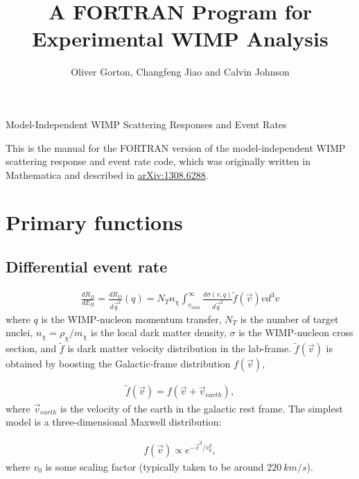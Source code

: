 \documentclass[11pt]{amsart}
\title{A FORTRAN Program for Experimental WIMP Analysis}
\author{Oliver Gorton, Changfeng Jiao and Calvin Johnson}
\begin{document}
\maketitle

{
\centering

Model-Independent WIMP Scattering Responses and Event Rates

}

\tableofcontents

This is the manual for the FORTRAN version of the model-independent WIMP scattering response and event rate code, which was originally written in Mathematica and described in \href{http://arxiv.org/abs/1308.6288v1}{arXiv:1308.6288}.

\section{Primary functions}

\subsection{Differential event rate}
\begin{equation}\label{ER}
\begin{split}
	\frac{dR_D}{dE_R} = \frac{dR_D}{d\vec{q}^2}(q)
	 = N_T n_\chi \int_{v_{min}}^\infty \frac{d\sigma(v,q)}{d\vec{q}^2} \tilde{f}(\vec{v})vd^3v
\end{split}
\end{equation}
where $q$ is the WIMP-nucleon momentum transfer, $N_T$ is the number of target nuclei, $n_\chi = \rho_\chi/m_\chi$ is the local dark matter density, $\sigma$ is the WIMP-nucleon cross section, and $\tilde{f}$ is dark matter velocity distribution in the lab-frame. $\tilde{f}(\vec{v})$ is obtained by boosting the Galactic-frame distribution $f(\vec{v})$, 

\begin{equation}\label{boost}
\begin{split}
	\tilde{f}(\vec{v}) = f(\vec{v} + \vec{v}_{earth}),
\end{split}
\end{equation}
where $\vec{v}_{earth}$ is the velocity of the earth in the galactic rest frame. The simplest model is a three-dimensional Maxwell distribution:

\begin{equation}
\begin{split}
	f(\vec{v}) \propto e^{-\vec{v}^2/v_0^2},
\end{split}
\end{equation}
where $v_0$ is some scaling factor (typically taken to be around $220\ km/s$).
\end{document}
